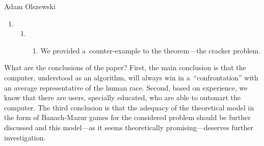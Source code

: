 \begin{artengenv}{Adam Olszewski}
\begin{enumerate}
\item \begin{enumerate}
\item \begin{enumerate}
\item We provided a~counter-example to the theorem—the cracker problem.
\end{enumerate}
\end{enumerate}
\end{enumerate}
What are the conclusions of the paper? First, the main conclusion is that the computer, understood as an algorithm, will always win in a~``confrontation'' with an average representative of the human race. Second, based on experience, we know that there are users, specially educated, who are able to outsmart the computer. The third conclusion is that the adequacy of the theoretical model in the form of Banach-Mazur games for the considered problem should be further discussed and this model—as it seems theoretically promising—deserves further investigation.



\end{artengenv}


